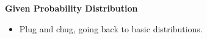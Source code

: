 \item \textbf{Given Probability Distribution}
\begin{itemize}
\item Plug and chug, going back to basic distributions.
\end{itemize}